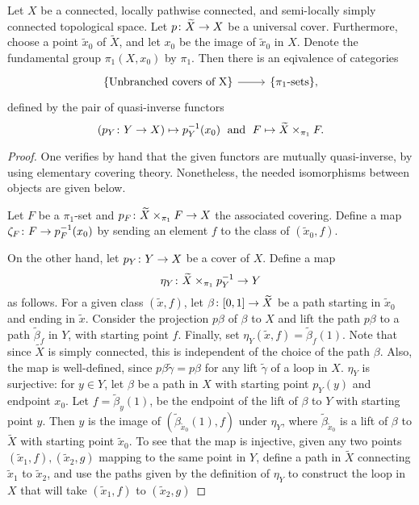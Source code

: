\begin{prop} \label{pr:classifying-covers}

 Let $X$ be a connected, locally pathwise connected, and semi-locally simply connected topological space. Let $p\colon\widetilde{X}\to X$ be a universal cover. Furthermore, choose a point $\widetilde{x}_0$ of $\widetilde{X}$, and let $x_0$ be the image of $\widetilde{x}_0$ in $X$. Denote the fundamental group $\pi_1(X,x_0)$ by $\pi_1$. Then there is an eqivalence of categories
 \[
 \begin{tikzcd}
  \{\text{Unbranched covers of X}\} \arrow{r} & \{\pi_1\text{-sets}\},
 \end{tikzcd}
 \]
 defined by the pair of quasi-inverse functors \[(p_Y\colon Y\to X) \mapsto p^{-1}_Y(x_0)\;\text{ and }\;F \mapsto \widetilde{X} \times_{\pi_1} F.\]
\end{prop}
\begin{proof}
 One verifies by hand that the given functors are mutually quasi-inverse, by using elementary covering theory. Nonetheless, the needed isomorphisms between objects are given below.
 
 Let $F$ be a $\pi_1$-set and $p_F\colon \widetilde{X} \times_{\pi_1} F \to X$ the associated covering. Define a map $\zeta_F\colon F\to p_F^{-1}(x_0)$ by sending an element $f$ to the class of $(\widetilde{x}_0,f)$.
 
 On the other hand, let $p_Y\colon Y\to X$ be a cover of $X$. Define a map \[\eta_Y\colon \widetilde{X}\times_{\pi_1} p_Y^{-1} \to Y\] as follows. For a given class $(\widetilde{x},f)$, let $\beta\colon [0,1] \to \widetilde{X}$ be a path starting in $\widetilde{x}_0$ and ending in $\widetilde{x}$. Consider the projection $p\beta$ of $\beta$ to $X$ and lift the path $p\beta$ to a path $\widetilde{\beta}_f$ in $Y$, with starting point $f$. Finally, set $\eta_Y(\widetilde{x},f)=\widetilde{\beta}_f(1)$. Note that since $\widetilde{X}$ is simply connected, this is independent of the choice of the path $\beta$. Also, the map is well-defined, since $p\beta \widetilde{\gamma} = p\beta$ for any lift $\widetilde{\gamma}$ of a loop in $X$.
 $\eta_Y$ is surjective: for $y \in Y$, let $\beta$ be a path in $X$ with starting point $p_Y(y)$ and endpoint $x_0$. Let $f=\widetilde{\beta}_{y}(1)$, be the endpoint of the lift of $\beta$ to $Y$ with starting point $y$. Then $y$ is the image of $(\widetilde{\beta}_{\widetilde{x}_0}(1),f)$ under $\eta_Y$, where $\widetilde{\beta}_{\widetilde{x}_0}$ is a lift of $\beta$ to $\widetilde{X}$ with starting point $\widetilde{x}_0$. To see that the map is injective, given any two points $(\widetilde{x}_1,f),(\widetilde{x}_2,g)$ mapping to the same point in $Y$, define a path in $\widetilde{X}$ connecting $\widetilde{x}_1$ to $\widetilde{x}_2$, and use the paths given by the definition of $\eta_Y$ to construct the loop in $X$ that will take $(\widetilde{x}_1,f)$ to $(\widetilde{x}_2,g)$
 \fi
\end{proof}

